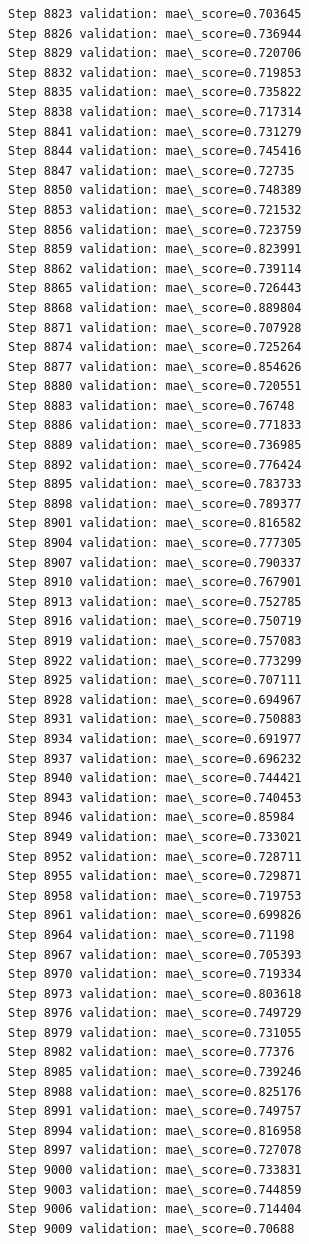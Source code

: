 \documentclass[11pt]{article}
\begin{document}
\begin{Verbatim}[commandchars=\\\{\}]
Step 8823 validation: mae\_score=0.703645
Step 8826 validation: mae\_score=0.736944
Step 8829 validation: mae\_score=0.720706
Step 8832 validation: mae\_score=0.719853
Step 8835 validation: mae\_score=0.735822
Step 8838 validation: mae\_score=0.717314
Step 8841 validation: mae\_score=0.731279
Step 8844 validation: mae\_score=0.745416
Step 8847 validation: mae\_score=0.72735
Step 8850 validation: mae\_score=0.748389
Step 8853 validation: mae\_score=0.721532
Step 8856 validation: mae\_score=0.723759
Step 8859 validation: mae\_score=0.823991
Step 8862 validation: mae\_score=0.739114
Step 8865 validation: mae\_score=0.726443
Step 8868 validation: mae\_score=0.889804
Step 8871 validation: mae\_score=0.707928
Step 8874 validation: mae\_score=0.725264
Step 8877 validation: mae\_score=0.854626
Step 8880 validation: mae\_score=0.720551
Step 8883 validation: mae\_score=0.76748
Step 8886 validation: mae\_score=0.771833
Step 8889 validation: mae\_score=0.736985
Step 8892 validation: mae\_score=0.776424
Step 8895 validation: mae\_score=0.783733
Step 8898 validation: mae\_score=0.789377
Step 8901 validation: mae\_score=0.816582
Step 8904 validation: mae\_score=0.777305
Step 8907 validation: mae\_score=0.790337
Step 8910 validation: mae\_score=0.767901
Step 8913 validation: mae\_score=0.752785
Step 8916 validation: mae\_score=0.750719
Step 8919 validation: mae\_score=0.757083
Step 8922 validation: mae\_score=0.773299
Step 8925 validation: mae\_score=0.707111
Step 8928 validation: mae\_score=0.694967
Step 8931 validation: mae\_score=0.750883
Step 8934 validation: mae\_score=0.691977
Step 8937 validation: mae\_score=0.696232
Step 8940 validation: mae\_score=0.744421
Step 8943 validation: mae\_score=0.740453
Step 8946 validation: mae\_score=0.85984
Step 8949 validation: mae\_score=0.733021
Step 8952 validation: mae\_score=0.728711
Step 8955 validation: mae\_score=0.729871
Step 8958 validation: mae\_score=0.719753
Step 8961 validation: mae\_score=0.699826
Step 8964 validation: mae\_score=0.71198
Step 8967 validation: mae\_score=0.705393
Step 8970 validation: mae\_score=0.719334
Step 8973 validation: mae\_score=0.803618
Step 8976 validation: mae\_score=0.749729
Step 8979 validation: mae\_score=0.731055
Step 8982 validation: mae\_score=0.77376
Step 8985 validation: mae\_score=0.739246
Step 8988 validation: mae\_score=0.825176
Step 8991 validation: mae\_score=0.749757
Step 8994 validation: mae\_score=0.816958
Step 8997 validation: mae\_score=0.727078
Step 9000 validation: mae\_score=0.733831
Step 9003 validation: mae\_score=0.744859
Step 9006 validation: mae\_score=0.714404
Step 9009 validation: mae\_score=0.70688

\end{Verbatim}
\end{document}
